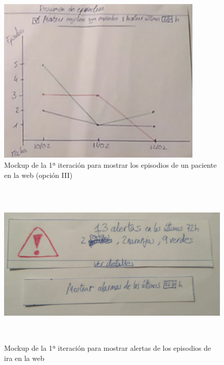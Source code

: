 \begin{figure}[H]
    \centering
    \includegraphics[width=0.7\linewidth, height=8cm]{Imagenes/04DescProblema/mockups/v1/web/06-resumenEpisodios-3.png}
    \caption[Mockup de la 1ª iteración para mostrar los episodios de un paciente en la web (opción III)]{Mockup de la 1ª iteración para mostrar los episodios de un paciente en la web (opción III)}
    \label{c4:fig:v1:web:tablaEpisodios3}
\end{figure}


\begin{figure}[H]
    \centering
    \includegraphics[width=0.7\linewidth, height=8cm]{Imagenes/04DescProblema/mockups/v1/web/08-alertas.jpg}
    \caption[Mockup de la 1ª iteración para mostrar alertas de los episodios de ira en la web]{Mockup de la 1ª iteración para mostrar alertas de los episodios de ira en la web}
    \label{c4:fig:v1:web:resumenAlertas}
\end{figure}

